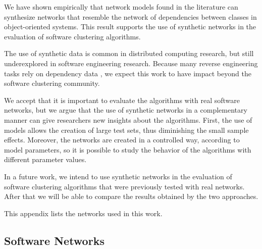 We have shown empirically that network models found in the literature can
synthesize networks that resemble the network of dependencies between classes in
object-oriented systems. This result supports the use of synthetic networks in
the evaluation of software clustering algorithms.

The use of synthetic data is common in distributed computing research, but still
underexplored in software engineering research. Because many reverse engineering
tasks rely on dependency data \cite{Tonella2007}, we expect this work to have
impact beyond the software clustering community.


We accept that it is important to evaluate the algorithms with real software
networks, but we argue that the use of synthetic networks in a complementary
manner can give researchers new insights about the algorithms. First, the use of
models allows the creation of large test sets, thus diminishing the small sample
effects. Moreover, the networks are created in a controlled way, according to
model parameters, so it is possible to study the behavior of the algorithms with
different parameter values.

In a future work, we intend to use synthetic networks in the evaluation of
software clustering algorithms that were previously tested with real networks.
After that we will be able to compare the results obtained by the two
approaches.

\appendix %

This appendix lists the networks used in this work.

\subsection{Software Networks}

